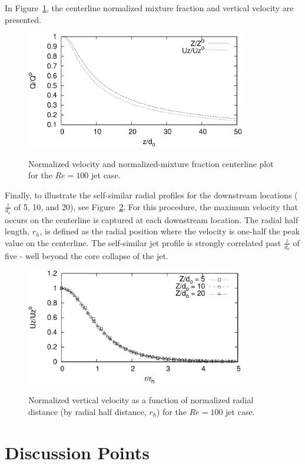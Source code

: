 \documentclass{article}
\begin{document}
In Figure~\ref{fig:centerline}, the centerline normalized mixture fraction and vertical velocity
are presented.
%
\begin{figure}[!htbp]
  \centering
  {
   \includegraphics[height=2.0in]{images/CenterlineData-crop.pdf}
  }
  \caption{Normalized velocity and normalized-mixture fraction centerline plot for the $Re = 100$ jet case.}
  \label{fig:centerline}
\end{figure}
%
Finally, to illustrate the self-similar radial profiles for the downstream locations ($\frac{z}{d_o}$ of 5, 10,
and 20), see Figure~\ref{fig:similar}. For this procedure, the maximum velocity that occurs on the centerline
is captured at each downstream location. The radial half length, $r_h$, is defined as the radial position where the
velocity is one-half the peak value on the centerline. The self-similar jet profile is strongly correlated past 
$\frac{z}{d_o}$ of five - well beyond the core collapse of the jet.

\begin{figure}[!htbp]
  \centering
  {
   \includegraphics[height=2.0in]{images/ZdHalf-crop.pdf}
  }
  \caption{Normalized vertical velocity as a function of normalized radial distance (by radial half distance, 
$r_h$) for the $Re = 100$ jet case.}
  \label{fig:similar}
\end{figure}

\section{Discussion Points}
\end{document}
